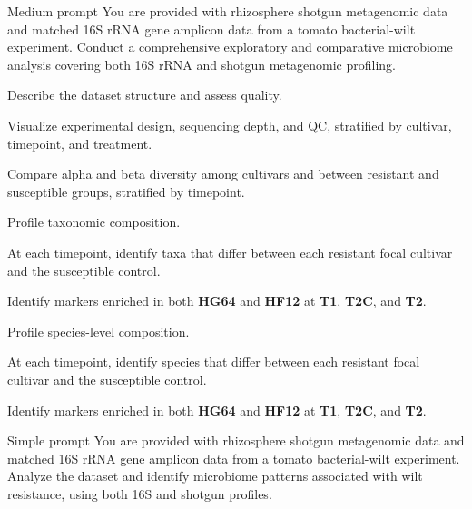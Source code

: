 \begin{promptbox}{Medium prompt}
You are provided with rhizosphere shotgun metagenomic data and matched 16S rRNA
gene amplicon data from a tomato bacterial-wilt experiment. Conduct a
comprehensive exploratory and comparative microbiome analysis covering both 16S
rRNA and shotgun metagenomic profiling.
\begin{promptitems}
\item Describe the dataset structure and assess quality.
\item Visualize experimental design, sequencing depth, and QC, stratified by
  cultivar, timepoint, and treatment.
\end{promptitems}
\begin{promptitems}
\item Compare alpha and beta diversity among cultivars and between resistant and
  susceptible groups, stratified by timepoint.
\item Profile taxonomic composition.
\item At each timepoint, identify taxa that differ between each resistant focal
  cultivar and the susceptible control.
\item Identify markers enriched in both \textbf{HG64} and \textbf{HF12} at
  \textbf{T1}, \textbf{T2C}, and \textbf{T2}.
\end{promptitems}
\begin{promptitems}
\item Profile species-level composition.
\item At each timepoint, identify species that differ between each resistant
  focal cultivar and the susceptible control.
\item Identify markers enriched in both \textbf{HG64} and \textbf{HF12} at
  \textbf{T1}, \textbf{T2C}, and \textbf{T2}.
\end{promptitems}
\end{promptbox}

\begin{promptbox}{Simple prompt}
You are provided with rhizosphere shotgun metagenomic data and matched 16S rRNA
gene amplicon data from a tomato bacterial-wilt experiment. Analyze the dataset
and identify microbiome patterns associated with wilt resistance, using both 16S
and shotgun profiles.
\end{promptbox}

